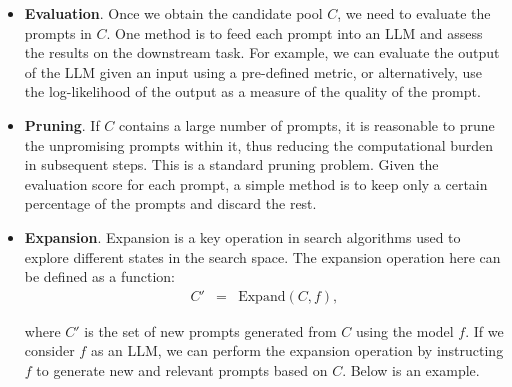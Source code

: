 \begin{itemize}
\begin{tcolorbox}
\vspace{0.2em}

Input: $\{*\mathrm{input}2*\}$\ \ \ Output: $\{*\mathrm{output}2*\}$

...

\vspace{0.5em}

\underline{\hspace{2em}}

\endgroup

\end{tcolorbox}
\vspace{0.5em}

In this way, LLMs can infer the corresponding instruction for the task from the provided inputs and outputs.

\item \vspace{0.3em} \textbf{Evaluation}. Once we obtain the candidate pool $C$, we need to evaluate the prompts in $C$. One method is to feed each prompt into an LLM and assess the results on the downstream task. For example, we can evaluate the output of the LLM given an input using a pre-defined metric, or alternatively, use the log-likelihood of the output as a measure of the quality of the prompt.

\item \vspace{0.3em} \textbf{Pruning}. If $C$ contains a large number of prompts, it is reasonable to prune the unpromising prompts within it, thus reducing the computational burden in subsequent steps. This is a standard pruning problem. Given the evaluation score for each prompt, a simple method is to keep only a certain percentage of the prompts and discard the rest.

\item \vspace{0.3em} \textbf{Expansion}. Expansion is a key operation in search algorithms used to explore different states in the search space. The expansion operation here can be defined as a function:
    \begin{eqnarray}
    C' & = & \mathrm{Expand}(C, f),
    \end{eqnarray}

    \noindent where $C'$ is the set of new prompts generated from $C$ using the model $f$. If we consider $f$ as an LLM, we can perform the expansion operation by instructing $f$ to generate new and relevant prompts based on $C$. Below is an example.


\end{itemize}
